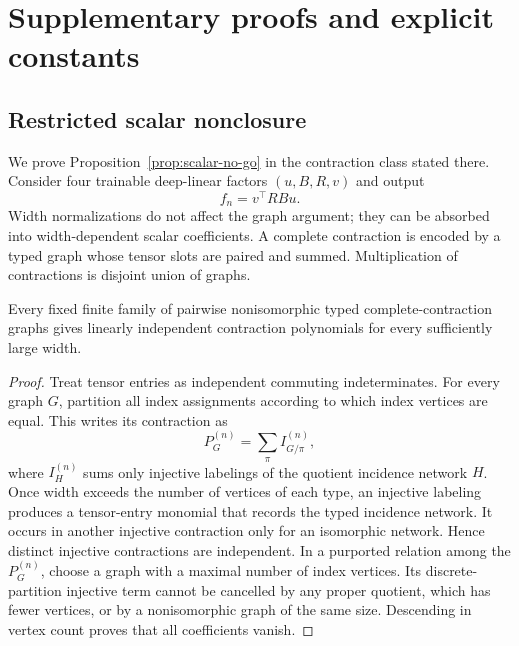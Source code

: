\section{Supplementary proofs and explicit constants}
\label{app:proofs}

\subsection{Restricted scalar nonclosure}
\label{app:scalar-no-go}

We prove Proposition~\ref{prop:scalar-no-go} in the contraction class stated
there.  Consider four trainable deep-linear factors $(u,B,R,v)$ and output
\begin{equation}
 f_n=v^\top RBu.
\end{equation}
Width normalizations do not affect the graph argument; they can be absorbed
into width-dependent scalar coefficients.  A complete contraction is encoded
by a typed graph whose tensor slots are paired and summed.  Multiplication of
contractions is disjoint union of graphs.

\begin{lemma}
Every fixed finite family of pairwise nonisomorphic typed complete-contraction
graphs gives linearly independent contraction polynomials for every
sufficiently large width.
\end{lemma}

\begin{proof}
Treat tensor entries as independent commuting indeterminates.  For every graph
$G$, partition all index assignments according to which index vertices are
equal.  This writes its contraction as
\begin{equation}
 P_G^{(n)}=\sum_\pi I_{G/\pi}^{(n)},
\end{equation}
where $I_H^{(n)}$ sums only injective labelings of the quotient incidence
network $H$.  Once width exceeds the number of vertices of each type, an
injective labeling produces a tensor-entry monomial that records the typed
incidence network.  It occurs in another injective contraction only for an
isomorphic network.  Hence distinct injective contractions are independent.
In a purported relation among the $P_G^{(n)}$, choose a graph with a maximal
number of index vertices.  Its discrete-partition injective term cannot be
cancelled by any proper quotient, which has fewer vertices, or by a
nonisomorphic graph of the same size.  Descending in vertex count proves that
all coefficients vanish.
\end{proof}


